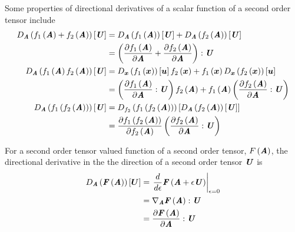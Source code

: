 Some properties of directional derivatives of a scalar function of a second
order tensor include
\begin{align}
  \directionalderiv{\tensor{A}}{\fnof{f_{1}}{\tensor{A}}+\fnof{f_{2}}{\tensor{A}}}{\tensor{U}}
  &=\directionalderiv{\tensor{A}}{\fnof{f_{1}}{\tensor{A}}}{\tensor{U}}
  +\directionalderiv{\tensor{A}}{\fnof{f_{2}}{\tensor{A}}}{\tensor{U}}
  \nonumber \\
  &=\doubledotprod{\pbrac{\delby{\fnof{f_{1}}{\tensor{A}}}{\tensor{A}}
      +\delby{\fnof{f_{2}}{\tensor{A}}}{\tensor{A}}}}{\tensor{U}}
  \label{eqn:AdditionRuleDirectDerivScalarValueTensorFunction} \\
  \directionalderiv{\tensor{A}}{\fnof{f_{1}}{\tensor{A}}\fnof{f_{2}}{\tensor{A}}}{\tensor{U}}
  &=\directionalderiv{\vectr{x}}{\fnof{f_{1}}{\vectr{x}}}{\vectr{u}}\fnof{f_{2}}{\vectr{x}}
  +\fnof{f_{1}}{\vectr{x}}\directionalderiv{\vectr{x}}{\fnof{f_{2}}{\vectr{x}}}{\vectr{u}}
  \nonumber \\
  &=\pbrac{\doubledotprod{\delby{\fnof{f_{1}}{\tensor{A}}}{\tensor{A}}}{\tensor{U}}}\fnof{f_{2}}{\tensor{A}}
  +\fnof{f_{1}}{\tensor{A}}\pbrac{\doubledotprod{\delby{\fnof{f_{2}}{\tensor{A}}}{\tensor{A}}}{\tensor{U}}}
  \label{eqn:ProductRuleDirectDerivScalarValueTensorFunction} \\
  \directionalderiv{\tensor{A}}{\fnof{f_{1}}{\fnof{f_{2}}{\tensor{A}}}}{\tensor{U}}
  &=\directionalderiv{f_{2}}{\fnof{f_{1}}{\fnof{f_{2}}{\tensor{A}}}}{\directionalderiv{\tensor{A}}{\fnof{f_{2}}{\tensor{A}}}{\tensor{U}}}
  \nonumber \\
  &=\delby{\fnof{f_{1}}{\fnof{f_{2}}{\tensor{A}}}}{\fnof{f_{2}}{\tensor{A}}}\pbrac{\doubledotprod{\delby{\fnof{f_{2}}{\tensor{A}}}{\tensor{A}}}{\tensor{U}}}
    \label{eqn:ChainRuleDirectDerivScalarValueTensorFunction}
\end{align}

For a second order tensor valued function of a second order tensor, $ F\left( \boldsymbol{\mathit{A}} \right) $,
the directional derivative in the the direction of a second order tensor
$\boldsymbol{\mathit{U}}$ is
\begin{equation}
  \begin{split}
    \directionalderiv{\tensor{A}}{\fnof{\tensor{F}}{\tensor{A}}}{\vectr{U}}
    &=\evalat{\dfrac{d}{d\epsilon}\fnof{\tensor{F}}{\tensor{A}+\epsilon\tensor{U}}}{\epsilon=0}\\
    &=\doubledotprod{\gradient{\tensor{A}}{\fnof{\tensor{F}}{\tensor{A}}}}{\tensor{U}}\\
    &=\doubledotprod{\delby{\fnof{\tensor{F}}{\tensor{A}}}{\tensor{A}}}{\tensor{U}}\\
  \end{split}  
\end{equation}

